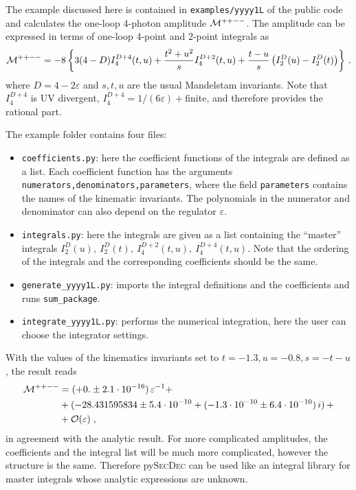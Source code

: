 \documentclass[Physsubmission, Phys]{SciPost}
\def\nn{\nonumber}
\newcommand{\pysecdec}{py{\textsc{SecDec}}}
\newcommand{\eps}{\varepsilon}
\begin{document}
The example discussed here is contained in \texttt{examples/yyyy1L} of the public code and calculates the one-loop 4-photon amplitude 
${\cal M}^{++--}$. The amplitude can be expressed in terms of one-loop 4-point and 2-point integrals as
\begin{align}
{\cal M}^{++--} =-8 
 \left\{ 3(4-D) I_{4}^{D+4}(t,u) + \frac{t^{2}+u^{2}}{s} I_{4}^{D+2}(t,u) +  \frac{t-u}{s}\left(
    I_{2}^{D}(u)-I_{2}^{D}(t) \right) \right\}\,.
\label{eq:masters}
\end{align}
where $D=4-2\eps$  and $s,t,u$ are the usual Mandelstam invariants.
Note that $I_{4}^{D+4}$ is UV divergent, $I_{4}^{D+4}=1/(6\eps)+$finite,  and therefore provides the
rational part.

The example folder contains four files: 
\begin{itemize}
\item \texttt{coefficients.py}: here the coefficient functions of the integrals are defined as a list.
 Each coefficient function has the arguments \texttt{numerators,denominators,parameters}, where the field \texttt{parameters} contains the names of the kinematic invariants. The polynomials in the numerator and denominator can also depend on the regulator $\eps$.
\item \texttt{integrals.py}: here the integrals are given as a list containing the ``master'' integrals $I_{2}^{D}(u),~I_{2}^{D}(t),~
I_{4}^{D+2}(t,u),~I_{4}^{D+4}(t,u)$. Note that the ordering of the integrals and the corresponding coefficients should be the same.
\item \texttt{generate\_yyyy1L.py}: imports the integral definitions and the coefficients and runs \texttt{sum\_package}. 
\item \texttt{integrate\_yyyy1L.py}: performs the numerical integration, here the user can choose the integrator settings.
\end{itemize}

\noindent With the values of the kinematics invariants set to $t=-1.3, u=-0.8, s=-t-u$, the result reads
\begin{align}
  {\cal M}^{++--} &= (+0. \pm 2.1\cdot 10^{-16} )\,\eps^{-1} +  \nn\\
                  &+ (-28.431595834\pm 5.4\cdot 10^{-10}+
                          (-1.3\cdot 10^{-10} \pm 6.4\cdot 10^{-10}) \, i) \, + \nn\\
&+\mathcal{O}(\eps)\;,
\end{align}
in agreement with the analytic result. For more complicated amplitudes, the coefficients and the integral list will be much more complicated, however the structure is the same. Therefore \pysecdec{} can be used like an integral library for master integrals whose analytic expressions are unknown.
\end{document}
